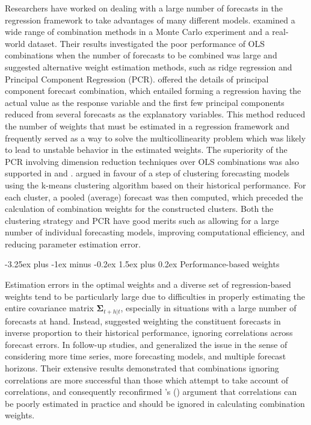 \documentclass[11pt]{article}
\makeatletter
\def\citeapos#1{\citeauthor{#1}'s (\citeyear{#1})}
\renewcommand{\paragraph}{\@startsection{paragraph}{4}{0ex}%
   {-3.25ex plus -1ex minus -0.2ex}%
   {1.5ex plus 0.2ex}%
   {\normalfont\normalsize\bfseries}}
\makeatother
\begin{document}
Researchers have worked on dealing with a large number of forecasts in the regression framework to take advantages of many different models. \cite{Chan1999-io} examined a wide range of combination methods in a Monte Carlo experiment and a real-world dataset. Their results investigated the poor performance of OLS combinations when the number of forecasts to be combined was large and suggested alternative weight estimation methods, such as ridge regression and Principal Component Regression (PCR). \cite{Stock2004-rq} offered the details of principal component forecast combination, which entailed forming a regression having the actual value as the response variable and the first few principal components reduced from several forecasts as the explanatory variables. This method reduced the number of weights that must be estimated in a regression framework and frequently served as a way to solve the multicollinearity problem which was likely to lead to unstable behavior in the estimated weights. The superiority of the PCR involving dimension reduction techniques over OLS combinations was also supported in \cite{Rapach2008-jh} and \cite{Poncela2011-vz}. \cite{Aiolfi2006-rh} argued in favour of a step of clustering forecasting models using the k-means clustering algorithm based on their historical performance. For each cluster, a pooled (average) forecast was then computed, which preceded the calculation of combination weights for the constructed clusters. Both the clustering strategy and PCR have good merits such as allowing for a large number of individual forecasting models, improving computational efficiency, and reducing parameter estimation error.

\paragraph{Performance-based weights}

Estimation errors in the optimal weights and a diverse set of regression-based weights tend to be particularly large due to difficulties in properly estimating the entire covariance matrix $\boldsymbol{\Sigma}_{t+h|t}$, especially in situations with a large number of forecasts at hand. Instead, \cite{Bates1969-yj} suggested weighting the constituent forecasts in inverse proportion to their historical performance, ignoring correlations across forecast errors. In follow-up studies, \cite{Newbold1974-lp} and \cite{Winkler1983-ra} generalized the issue in the sense of considering more time series, more forecasting models, and multiple forecast horizons. Their extensive results demonstrated that combinations ignoring correlations are more successful than those which attempt to take account of correlations, and consequently reconfirmed \citeapos{Bates1969-yj} argument that correlations can be poorly estimated in practice and should be ignored in calculating combination weights.
\end{document}
